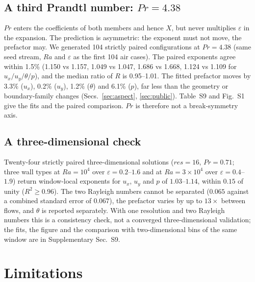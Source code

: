 \documentclass[preprint,11pt,a4paper,times,doubleblind]{elsarticle}
\begin{document}
\subsection{A third Prandtl number: $Pr=4.38$}
\label{sec:water}

$Pr$ enters the coefficients of both members and hence $X$, but never multiplies $\varepsilon$ in
the expansion. The prediction is asymmetric: the exponent must not move, the prefactor may. We
generated 104 strictly paired configurations at $Pr=4.38$ (same seed stream, $Ra$ and
$\varepsilon$ as the first 104 air cases). The paired exponents agree within 1.5\% (1.150 vs
1.157, 1.049 vs 1.047, 1.686 vs 1.668, 1.124 vs 1.109 for $u_x/u_y/\theta/p$), and the
median ratio of $R$ is 0.95--1.01. The fitted prefactor moves by 3.3\% ($u_x$), 0.2\% ($u_y$),
1.2\% ($\theta$) and 6.1\% ($p$), far less than the geometry or boundary-family changes
(Secs.~\ref{sec:aspect}, \ref{sec:public}). Table~S9 and Fig.~S1 give the fits and the paired
comparison. $Pr$ is therefore not a break-symmetry axis.

\subsection{A three-dimensional check}
\label{sec:3d}

Twenty-four strictly paired three-dimensional solutions ($res=16$, $Pr=0.71$; three wall types at
$Ra=10^4$ over $\varepsilon=0.2$--$1.6$ and at $Ra=3\times10^4$ over $\varepsilon=0.4$--$1.9$)
return window-local exponents for $u_x$, $u_y$ and $p$ of $1.03$--$1.14$, within $0.15$ of unity
($R^2\ge0.96$). The two Rayleigh numbers cannot be separated ($0.065$ against a combined standard
error of $0.067$), the prefactor varies by up to $13\times$ between flows, and $\theta$ is reported
separately. With one resolution and two Rayleigh numbers this is a consistency check, not a
converged three-dimensional validation; the fits, the figure and the comparison with two-dimensional
bins of the same window are in Supplementary Sec.~S9.

\section{Limitations}
\label{sec:limits}
\end{document}
